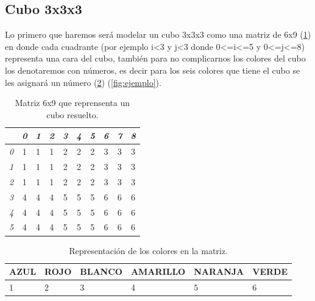 \documentclass[oneside,10pt]{article}
\begin{document}
\subsection{Cubo 3x3x3}
Lo primero que haremos ser\'a modelar un cubo 3x3x3 como una matriz de 6x9 (\ref{tabla:matriz}) en donde cada cuadrante (por ejemplo i<3 y j<3 donde 0<=i<=5 y 0<=j<=8) representa una cara del cubo, tambi\'en para no complicarnos los colores del cubo los denotaremos con n\'umeros, es decir para los seis colores que tiene el cubo se les asignar\'a un n\'umero  (\ref{tabla:numcol}) (\ref{fig:ejemplo}).
\\
\begin{table}[htbp]
\begin{center}
\begin{tabular}{|c||c|c|c|c|c|c|c|c|c|}
\hline
&\textsl{0}&\textsl{1}&\textsl{2}&\textsl{3}&\textsl{4}&\textsl{5}&\textsl{6}&\textsl{7}&\textsl{8} \\
\hline \hline
\textsl{0}&1&1&1&2&2&2&3&3&3 \\
\hline
\textsl{1}&1&1&1&2&2&2&3&3&3 \\
\hline
\textsl{2}&1&1&1&2&2&2&3&3&3 \\
\hline
\textsl{3}&4&4&4&5&5&5&6&6&6 \\
\hline
\textsl{4}&4&4&4&5&5&5&6&6&6 \\
\hline
\textsl{5}&4&4&4&5&5&5&6&6&6 \\
\hline
\end{tabular}
\caption{Matriz 6x9 que reprensenta un cubo resuelto.}
\label{tabla:matriz}
\end{center}
\end{table}

\begin{table}[htbp]
\begin{center}
\begin{tabular}{|l|l|l|l|l|l|}
\hline
AZUL & ROJO & BLANCO & AMARILLO & NARANJA & VERDE \\
\hline
1 & 2 & 3 & 4 & 5 & 6 \\
\hline
\end{tabular}
\caption{Representaci\'on de los colores en la matriz.}
\label{tabla:numcol}
\end{center}
\end{table}

\newpage
\end{document}
